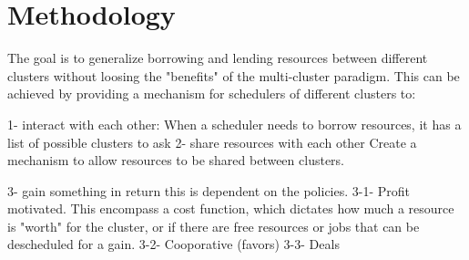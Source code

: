 \section{Methodology}
The goal is to generalize borrowing and lending resources between different clusters 
without loosing the "benefits" of the multi-cluster paradigm. %
This can be achieved by providing a mechanism for schedulers of different clusters to:

1- interact with each other:
When a scheduler needs to borrow resources, it has a list of possible clusters to ask
2- share resources with each other
Create a mechanism to allow resources to be shared between clusters.

3- gain something in return
this is dependent on the policies.
3-1- Profit motivated. This encompass a cost function, which dictates how much a resource is "worth" for
the cluster, or if there are free resources or jobs that can be descheduled for a gain.
3-2- Cooporative (favors)
3-3- Deals